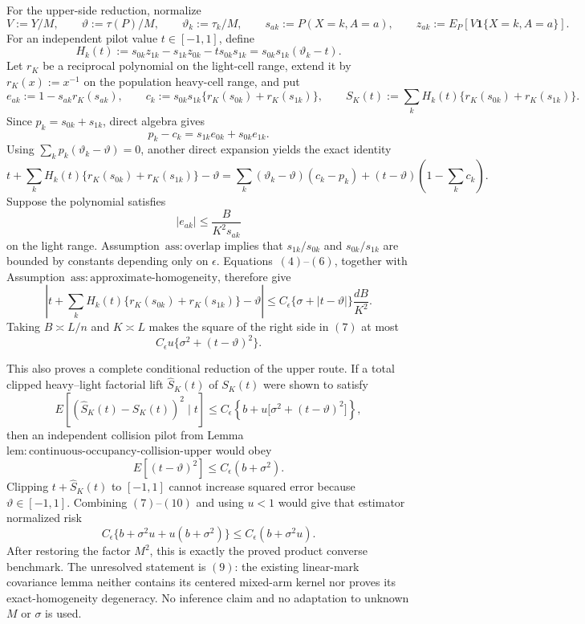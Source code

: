 For the upper-side reduction, normalize
\[
 V:=Y/M,\qquad \vartheta:=\tau(P)/M,\qquad
 \vartheta_k:=\tau_k/M,\qquad
 s_{ak}:=P(X=k,A=a),\qquad
 z_{ak}:=E_P[V\mathbf 1\{X=k,A=a\}].
\]
For an independent pilot value \(t\in[-1,1]\), define
\[
 H_k(t):=s_{0k}z_{1k}-s_{1k}z_{0k}-t s_{0k}s_{1k}
 =s_{0k}s_{1k}(\vartheta_k-t).
\]
Let \(r_K\) be a reciprocal polynomial on the light-cell range, extend it by \(r_K(x):=x^{-1}\) on the population heavy-cell range, and put
\[
 e_{ak}:=1-s_{ak}r_K(s_{ak}),\qquad
 c_k:=s_{0k}s_{1k}\{r_K(s_{0k})+r_K(s_{1k})\},
 \qquad
 S_K(t):=\sum_kH_k(t)\{r_K(s_{0k})+r_K(s_{1k})\}.
\]
Since \(p_k=s_{0k}+s_{1k}\), direct algebra gives
\[
 p_k-c_k=s_{1k}e_{0k}+s_{0k}e_{1k}.
\tag{4}
\]
Using \(\sum_kp_k(\vartheta_k-\vartheta)=0\), another direct expansion yields the exact identity
\[
 t+\sum_kH_k(t)\{r_K(s_{0k})+r_K(s_{1k})\}-\vartheta
 =\sum_k(\vartheta_k-\vartheta)(c_k-p_k)
 +(t-\vartheta)\left(1-\sum_kc_k\right).
\tag{5}
\]
Suppose the polynomial satisfies
\[
 |e_{ak}|\le \frac{B}{K^2s_{ak}}
\tag{6}
\]
on the light range.  Assumption~\(\mathrm{ass:overlap}\) implies that \(s_{1k}/s_{0k}\) and \(s_{0k}/s_{1k}\) are bounded by constants depending only on \(\epsilon\).  Equations~\((4)\)--\((6)\), together with Assumption~\(\mathrm{ass:approximate\text{-}homogeneity}\), therefore give
\[
 \left|t+\sum_kH_k(t)\{r_K(s_{0k})+r_K(s_{1k})\}-\vartheta\right|
 \le C_{\epsilon}\{\sigma+|t-\vartheta|\}\frac{dB}{K^2}.
\tag{7}
\]
Taking \(B\asymp L/n\) and \(K\asymp L\) makes the square of the right side in \((7)\) at most
\[
 C_{\epsilon}u\{\sigma^2+(t-\vartheta)^2\}.
\tag{8}
\]

This also proves a complete conditional reduction of the upper route.  If a total clipped heavy--light factorial lift \(\widehat S_K(t)\) of \(S_K(t)\) were shown to satisfy
\[
 E\!\left[(\widehat S_K(t)-S_K(t))^2\mid t\right]
 \le C_{\epsilon}\left\{b+u\bigl[\sigma^2+(t-\vartheta)^2\bigr]\right\},
\tag{9}
\]
then an independent collision pilot from Lemma~\(\mathrm{lem:continuous\text{-}occupancy\text{-}collision\text{-}upper}\) would obey
\[
 E[(t-\vartheta)^2]\le C_{\epsilon}(b+\sigma^2).
\tag{10}
\]
Clipping \(t+\widehat S_K(t)\) to \([-1,1]\) cannot increase squared error because \(\vartheta\in[-1,1]\).  Combining \((7)\)--\((10)\) and using \(u<1\) would give that estimator normalized risk
\[
 C_{\epsilon}\{b+\sigma^2u+u(b+\sigma^2)\}
 \le C_{\epsilon}(b+\sigma^2u).
\]
After restoring the factor \(M^2\), this is exactly the proved product converse benchmark.  The unresolved statement is \((9)\): the existing linear-mark covariance lemma neither contains its centered mixed-arm kernel nor proves its exact-homogeneity degeneracy.  No inference claim and no adaptation to unknown \(M\) or \(\sigma\) is used.
